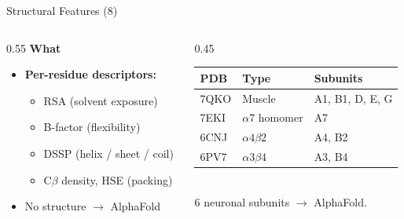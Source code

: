 \documentclass[aspectratio=169]{beamer}
\begin{document}
\begin{frame}{Structural Features (8)}
\begin{columns}[T]
\begin{column}{0.55\textwidth}
\textbf{What}
\begin{itemize}\setlength\itemsep{0.5em}
  \item \textbf{Per-residue descriptors:}
        \begin{itemize}
          \item RSA (solvent exposure)
          \item B-factor (flexibility)
          \item DSSP (helix / sheet / coil)
          \item C$\beta$ density, HSE (packing)
        \end{itemize}
  \item No structure $\rightarrow$ AlphaFold
\end{itemize}
\end{column}
\begin{column}{0.45\textwidth}
\centering
\small
\begin{tabular}{@{}lll@{}}
\toprule
\textbf{PDB} & \textbf{Type} & \textbf{Subunits} \\
\midrule
7QKO & Muscle & A1, B1, D, E, G \\
7EKI & $\alpha$7 homomer & A7 \\
6CNJ & $\alpha4\beta2$ & A4, B2 \\
6PV7 & $\alpha3\beta4$ & A3, B4 \\
\bottomrule
\end{tabular}
\\[0.3cm]
\footnotesize 6 neuronal subunits $\rightarrow$ AlphaFold.
\end{column}
\end{columns}
\end{frame}

\end{document}
